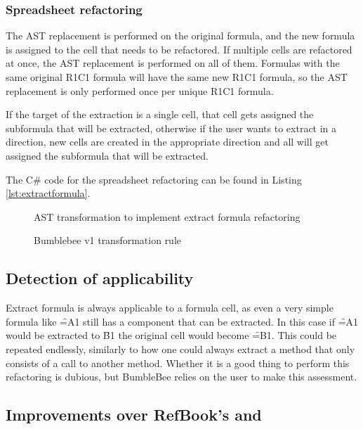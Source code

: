 \subsubsection{Spreadsheet refactoring}

The AST replacement is performed on the original formula, and the new formula is assigned to the cell that needs to be refactored.
If multiple cells are refactored at once, the AST replacement is performed on all of them.
Formulas with the same original R1C1 formula will have the same new R1C1 formula, so the AST replacement is only performed once per unique R1C1 formula.

If the target of the extraction is a single cell, that cell gets assigned the subformula that will be extracted, otherwise if the user wants to extract in a direction, new cells are created in the appropriate direction and all will get assigned the subformula that will be extracted.

The C\# code for the spreadsheet refactoring can be found in Listing \ref{lst:extractformula}.

\begin{figure}
	\centering
	
	\caption{AST transformation to implement extract formula refactoring}
	\label{fig:extractformulaASTtransformations}
\end{figure}

\begin{figure}
	\centering
	
	\caption{Bumblebee v1 transformation rule}
	\label{fig:bbv1transformationrule}
\end{figure}

\newpage

\subsection{Detection of applicability}

Extract formula is always applicable to a formula cell, as even a very simple formula like \f{=A1} still has a component that can be extracted.
In this case if \f{=A1} would be extracted to \f{B1} the original cell would become \f{=B1}.
This could be repeated endlessly, similarly to how one could always extract a method that only consists of a call to another method.
Whether it is a good thing to perform this refactoring is dubious, but BumbleBee relies on the user to make this assessment.

\subsection{Improvements over RefBook's  and }
\label{subsubsec:improvementsextractformula}

